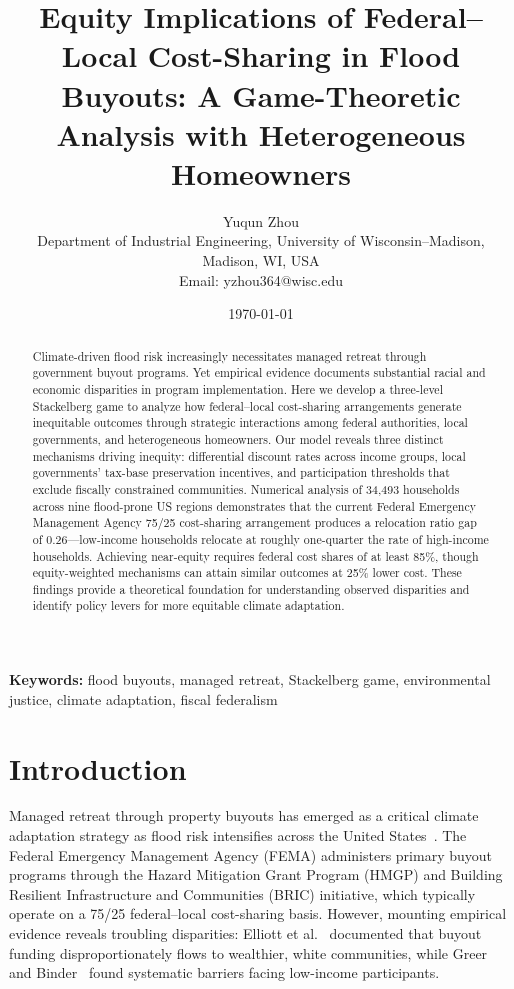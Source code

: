 \documentclass[11pt,letterpaper]{article}
\title{\Large\textbf{Equity Implications of Federal--Local Cost-Sharing in Flood Buyouts: A Game-Theoretic Analysis with Heterogeneous Homeowners}}
\author{
Yuqun Zhou\\[0.5em]
\small Department of Industrial Engineering, University of Wisconsin--Madison, Madison, WI, USA\\
\small Email: yzhou364@wisc.edu
}
\date{\today}
\theoremstyle{definition}
\begin{document}
\maketitle


\begin{abstract}
\noindent
Climate-driven flood risk increasingly necessitates managed retreat through government buyout programs. Yet empirical evidence documents substantial racial and economic disparities in program implementation. Here we develop a three-level Stackelberg game to analyze how federal--local cost-sharing arrangements generate inequitable outcomes through strategic interactions among federal authorities, local governments, and heterogeneous homeowners. Our model reveals three distinct mechanisms driving inequity: differential discount rates across income groups, local governments' tax-base preservation incentives, and participation thresholds that exclude fiscally constrained communities. Numerical analysis of 34,493 households across nine flood-prone US regions demonstrates that the current Federal Emergency Management Agency 75/25 cost-sharing arrangement produces a relocation ratio gap of 0.26---low-income households relocate at roughly one-quarter the rate of high-income households. Achieving near-equity requires federal cost shares of at least 85\%, though equity-weighted mechanisms can attain similar outcomes at 25\% lower cost. These findings provide a theoretical foundation for understanding observed disparities and identify policy levers for more equitable climate adaptation.
\end{abstract}

\vspace{1em}
\noindent\textbf{Keywords:} flood buyouts, managed retreat, Stackelberg game, environmental justice, climate adaptation, fiscal federalism


\section{Introduction}

Managed retreat through property buyouts has emerged as a critical climate adaptation strategy as flood risk intensifies across the United States~\cite{siders2019strategic, mach2019managed}. The Federal Emergency Management Agency (FEMA) administers primary buyout programs through the Hazard Mitigation Grant Program (HMGP) and Building Resilient Infrastructure and Communities (BRIC) initiative, which typically operate on a 75/25 federal--local cost-sharing basis. However, mounting empirical evidence reveals troubling disparities: Elliott et al.~\cite{elliott2020racial} documented that buyout funding disproportionately flows to wealthier, white communities, while Greer and Binder~\cite{greer2017political} found systematic barriers facing low-income participants.
\end{document}
